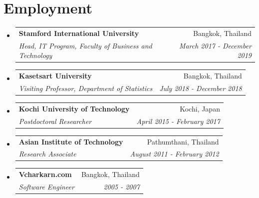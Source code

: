 \documentclass[letterpaper,11pt]{article}
\makeatletter
\newcommand{\resumeItem}[2]{
  \item\small{
    \textbf{#1}{: #2 \vspace{-2pt}}
  }
}
\newcommand{\resumeSubheading}[4]{
  \vspace{-1pt}\item
    \begin{tabular*}{0.97\textwidth}{l@{\extracolsep{\fill}}r}
      \textbf{#1} & #2 \\
      \textit{\small#3} & \textit{\small #4} \\
    \end{tabular*}\vspace{-5pt}
}
\newcommand{\resumeSubItem}[2]{\resumeItem{#1}{#2}\vspace{-4pt}}
\newcommand{\resumeSubHeadingListStart}{\begin{itemize}[leftmargin=*]}
\newcommand{\resumeSubHeadingListEnd}{\end{itemize}}
\makeatother
\begin{document}

\section{Employment}

\resumeSubHeadingListStart

\resumeSubheading
{Stamford International University}{Bangkok, Thailand}
{Head, IT Program, Faculty of Business and Technology}{March 2017 - December 2019}

\resumeSubheading
{Kasetsart University}{Bangkok, Thailand}
{Visiting Professor, Department of Statistics}{July 2018 - December 2018}

\resumeSubheading
{Kochi University of Technology}{Kochi, Japan}
{Postdoctoral Researcher}{April 2015 - February 2017}

\resumeSubheading
{Asian Institute of Technology}{Pathumthani, Thailand}
{Research Associate}{August 2011 - February 2012}

\resumeSubheading
{Vcharkarn.com}{Bangkok, Thailand}
{Software Engineer}{2005 - 2007}

\resumeSubHeadingListEnd

\end{document}

